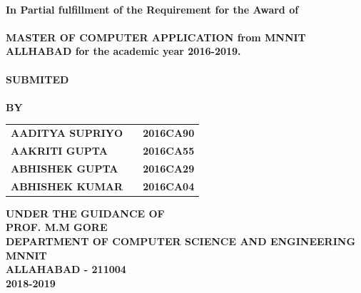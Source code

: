 \begin{center}
\vspace{1cm}
\Large{\textbf{\\In Partial fulfillment  of the Requirement for the Award of\\}}
\Large{\textbf{\\MASTER OF
COMPUTER APPLICATION from MNNIT ALLHABAD for the academic year 2016-2019.\\}}
\vspace{1cm}
\Large{\textbf{\\SUBMITED}}\\[0.1cm]
\Large{\textbf{\\BY}}\\[0.5cm]
\begin{table}[h]
\centering
\Large{
\begin{tabular}{>{\bfseries}lc>{\bfseries}r}
AADITYA SUPRIYO & & 2016CA90\\AAKRITI GUPTA & & 2016CA55\\ABHISHEK GUPTA & & 2016CA29\\ABHISHEK KUMAR & & 2016CA04\\
\end{tabular}}
\end{table}
\vspace{0.5cm}
\large{\textbf{UNDER THE GUIDANCE OF}}\\
\LARGE{\textbf{PROF.  M.M GORE}}\\
\vspace{0.5cm}
\large{\textbf{DEPARTMENT OF COMPUTER SCIENCE AND ENGINEERING}}\\
\Large{\textbf{MNNIT}}\\
\large{\textbf{ALLAHABAD - 211004}}
\large{\textbf{\\2018-2019}}\\
\vspace{1cm}
\newpage
\end{center}